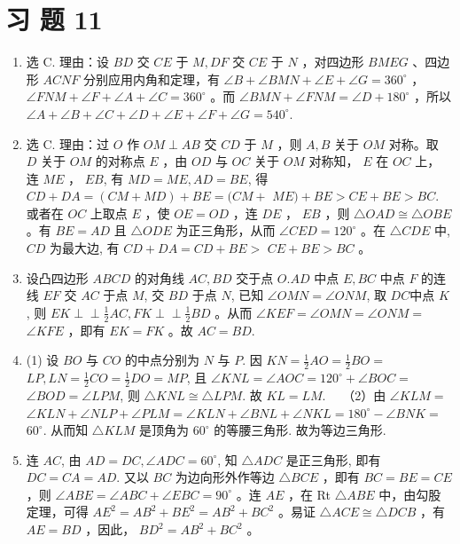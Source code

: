 \documentclass[10pt]{article}
\def\Perp{\perp\!\!\!\perp}
\begin{document}
\section*{习 题 11}
\begin{enumerate}
  \item 选 C. 理由：设 $B D$ 交 $C E$ 于 $M, D F$ 交 $C E$ 于 $N$ ，对四边形 $B M E G$ 、四边形 $A C N F$ 分别应用内角和定理，有 $\angle B+\angle B M N+\angle E+\angle G=360^{\circ}$ ， $\angle F N M+\angle F+\angle A+\angle C=360^{\circ}$ 。而 $\angle B M N+\angle F N M=\angle D+180^{\circ}$ ，所以 $\angle A+\angle B+\angle C+\angle D+\angle E+\angle F+\angle G=540^{\circ}$.
  \item 选 C. 理由：过 $O$ 作 $O M \perp A B$ 交 $C D$ 于 $M$ ，则 $A, B$ 关于 $O M$ 对称。取 $D$ 关于 $O M$ 的对称点 $E$ ，由 $O D$ 与 $O C$ 关于 $O M$ 对称知， $E$ 在 $O C$ 上，连 $M E$ ， $E B$, 有 $M D=M E, A D=B E$, 得 $C D+D A=(C M+M D)+B E=(C M+$ $M E)+B E>C E+B E>B C$. 或者在 $O C$ 上取点 $E$ ，使 $O E=O D$ ，连 $D E$ ， $E B$ ，则 $\triangle O A D \cong \triangle O B E$ 。有 $B E=A D$ 且 $\triangle O D E$ 为正三角形，从而 $\angle C E D=120^{\circ}$ 。在 $\triangle C D E$ 中, $C D$ 为最大边, 有 $C D+D A=C D+B E>$ $C E+B E>B C$ 。
  \item 设凸四边形 $A B C D$ 的对角线 $A C, B D$ 交于点 $O . A D$ 中点 $E, B C$ 中点 $F$ 的连线 $E F$ 交 $A C$ 于点 $M$, 交 $B D$ 于点 $N$, 已知 $\angle O M N=\angle O N M$, 取 $D C$中点 $K$, 则 $E K \Perp \frac{1}{2} A C, F K \Perp \frac{1}{2} B D$ 。从而 $\angle K E F=\angle O M N=\angle O N M=$ $\angle K F E$ ，即有 $E K=F K$ 。故 $A C=B D$.
  \item (1) 设 $B O$ 与 $C O$ 的中点分别为 $N$ 与 $P$. 因 $K N=\frac{1}{2} A O=\frac{1}{2} B O=$ $L P, L N=\frac{1}{2} C O=\frac{1}{2} D O=M P$, 且 $\angle K N L=\angle A O C=120^{\circ}+\angle B O C=$ $\angle B O D=\angle L P M$, 则 $\triangle K N L \cong \triangle L P M$. 故 $K L=L M . \quad$ （2）由 $\angle K L M=$ $\angle K L N+\angle N L P+\angle P L M=\angle K L N+\angle B N L+\angle N K L=180^{\circ}-\angle B N K=$\\
$60^{\circ}$. 从而知 $\triangle K L M$ 是顶角为 $60^{\circ}$ 的等腰三角形. 故为等边三角形.
  \item 连 $A C$, 由 $A D=D C, \angle A D C=60^{\circ}$, 知 $\triangle A D C$ 是正三角形, 即有 $D C=C A=A D$. 又以 $B C$ 为边向形外作等边 $\triangle B C E$ ，即有 $B C=B E=C E$ ，则 $\angle A B E=\angle A B C+\angle E B C=90^{\circ}$ 。连 $A E$ ，在 Rt $\triangle A B E$ 中，由勾股定理，可得 $A E^{2}=A B^{2}+B E^{2}=A B^{2}+B C^{2}$ 。易证 $\triangle A C E \cong \triangle D C B$ ，有 $A E=B D$ ，因此， $B D^{2}=A B^{2}+B C^{2}$ 。

\end{enumerate}
\end{document}
